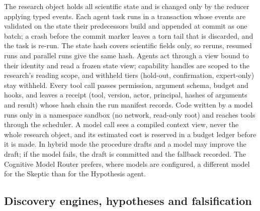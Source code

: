 \documentclass[
]{article}
\begin{document}
The research object holds all scientific state and is changed only by
the reducer applying typed events. Each agent task runs in a transaction
whose events are validated on the state their predecessors build and
appended at commit as one batch; a crash before the commit marker leaves
a torn tail that is discarded, and the task is re-run. The state hash
covers scientific fields only, so reruns, resumed runs and parallel runs
give the same hash. Agents act through a view bound to their identity
and read a frozen state view; capability handles are scoped to the
research's reading scope, and withheld tiers (hold-out, confirmation,
expert-only) stay withheld. Every tool call passes permission, argument
schema, budget and hooks, and leaves a receipt (tool, version, actor,
principal, hashes of arguments and result) whose hash chain the run
manifest records. Code written by a model runs only in a namespace
sandbox (no network, read-only root) and reaches tools through the
scheduler. A model call sees a compiled context view, never the whole
research object, and its estimated cost is reserved in a budget ledger
before it is made. In hybrid mode the procedure drafts and a model may
improve the draft; if the model fails, the draft is committed and the
fallback recorded. The Cognitive Model Router prefers, where models are
configured, a different model for the Skeptic than for the Hypothesis
agent.

\hypertarget{discovery-engines-hypotheses-and-falsification}{%
\subsection{Discovery engines, hypotheses and
falsification}\label{discovery-engines-hypotheses-and-falsification}}
\end{document}
